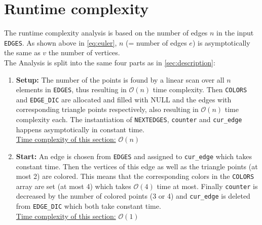 \documentclass[english]{scrartcl}
\newcommand{\code}{\texttt}
\begin{document}
\section{Runtime complexity}
\label{sec:runtime_comp}
The runtime complexity analysis is based on the number of edges $n$ in the input \code{EDGES}. As shown above in \autoref{eq:euler}, $n$ (= number of edges $e$) is asymptotically the same as $v$ the number of vertices.\\
The Analysis is split into the same four parts as in \autoref{sec:description}:
\begin{enumerate}
    \item \textbf{Setup:} The number of the points is found by a linear scan over all $n$ elements in \code{EDGES}, thus resulting in $\mathcal{O}(n)$ time complexity. Then \code{COLORS} and \code{EDGE\_DIC} are allocated and filled with NULL and the edges with corresponding triangle points respectively, also resulting in $\mathcal{O}(n)$ time complexity each. The instantiation of \code{NEXTEDGES}, \code{counter} and \code{cur\_edge} happens asymptotically in constant time. \\ \underline{Time complexity of this section:} $\mathcal{O}(n)$
    \item \textbf{Start:} An edge is chosen from \code{EDGES} and assigned to \code{cur\_edge} which takes constant time. Then the vertices of this edge as well as the triangle points (at most 2) are colored. This means that the corresponding colors in the \code{COLORS} array are set (at most 4) which takes $\mathcal{O}(4)$ time at most. Finally \code{counter} is decreased by the number of colored points (3 or 4) and \code{cur\_edge} is deleted from \code{EDGE\_DIC} which both take constant time.  \\ \underline{Time complexity of this section:} $\mathcal{O}(1)$

\end{enumerate}
\end{document}

